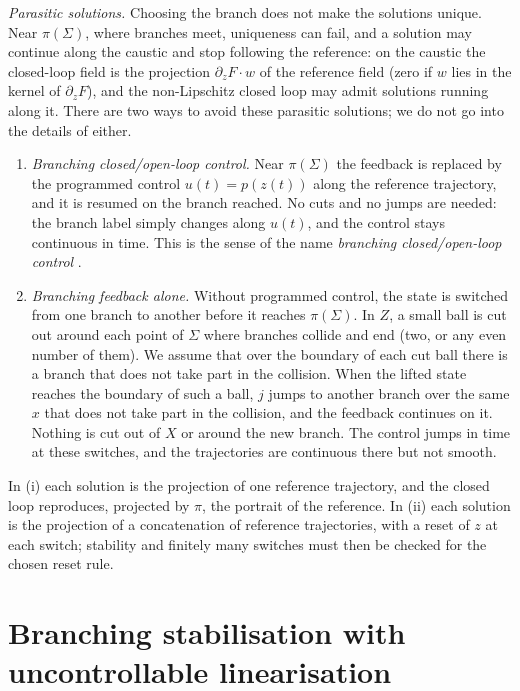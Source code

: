 \documentclass[11pt,reqno]{amsart}
\theoremstyle{plain}
\theoremstyle{definition}
\theoremstyle{remark}
\newcommand{\Sig}{\Sigma}
\begin{document}
\emph{Parasitic solutions.} Choosing the branch does not make the solutions unique. Near $\pi(\Sig)$, where
branches meet, uniqueness can fail, and a solution may continue along the caustic and stop following the reference: on the caustic the closed-loop
field is the projection $\partial_zF\cdot w$ of the reference field (zero if $w$ lies in the kernel of $\partial_zF$), and the non-Lipschitz closed loop may admit solutions running along it. There are two ways to avoid these parasitic solutions; we do not go into the details of either.
\begin{enumerate}
\item[(i)] \emph{Branching closed/open-loop control.} Near $\pi(\Sig)$ the feedback is replaced by the programmed
  control $u(t)=p(z(t))$ along the reference trajectory, and it is resumed on the branch reached. No cuts
  and no jumps are needed: the branch label simply changes along $u(t)$, and the control stays continuous in time. This is the sense of the name \emph{branching closed/open-loop control}
  \cite[\S3]{Shosh1990}.
\item[(ii)] \emph{Branching feedback alone.} Without programmed control, the state is switched from one branch to
  another before it reaches $\pi(\Sig)$. In $Z$, a small ball is cut out around each point of $\Sig$ where branches
  collide and end (two, or any even number of them). We assume that over the boundary of each cut ball there is
  a branch that does not take part in the collision. When the lifted state reaches the boundary of such a ball, $j$
  jumps to another branch over the same $x$ that does not take part in the collision, and the feedback continues on
  it. Nothing is cut out of $X$ or around the new branch. The control jumps in time at these switches,
  and the trajectories are continuous there but not smooth.
\end{enumerate}
In (i) each solution is the projection of one reference trajectory, and the closed loop reproduces, projected
by $\pi$, the portrait of the reference. In (ii) each solution is the projection of a concatenation of reference
trajectories, with a reset of $z$ at each switch; stability and finitely many switches must then be checked for
the chosen reset rule.

\section{Branching stabilisation with uncontrollable linearisation}\label{sec:stab}
\end{document}
